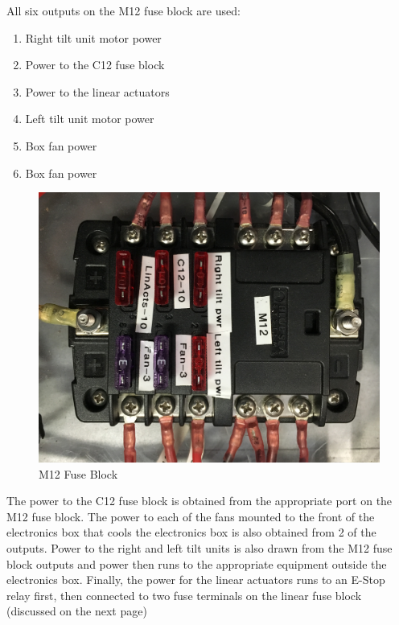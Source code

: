 \begin{minipage}{0.6\textwidth}
All six outputs on the M12 fuse block are used:
\begin{enumerate}
\item Right tilt unit motor power
\item Power to the C12 fuse block
\item Power to the linear actuators
\item Left tilt unit motor power
\item Box fan power
\item Box fan power
\end{enumerate}
\end{minipage} \hfill
\begin{minipage}{0.5\textwidth}
\begin{figure}[H]
\centering
\includegraphics[scale=.06, angle=90]{Photos/M12.jpg}
\caption{\label{fig:M12} M12 Fuse Block}
\end{figure}
\end{minipage}

\bigskip

\noindent The power to the C12 fuse block is obtained from the appropriate port on the M12 fuse block. The power to each of the fans mounted to the front of the electronics box that cools the electronics box is also obtained from 2 of the outputs. Power to the right and left tilt units is also drawn from the M12 fuse block outputs and power then runs to the appropriate equipment outside the electronics box. Finally, the power for the linear actuators runs to an E-Stop relay first, then connected to two fuse terminals on the linear fuse block (discussed on the next page)


